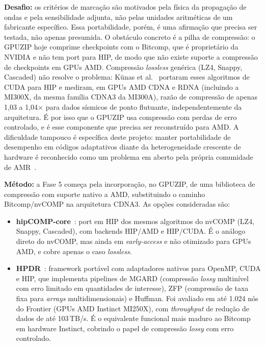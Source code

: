 \documentclass[12pt,a4paper]{article}
\begin{document}
\textbf{Desafio:} os critérios de marcação são motivados pela física da
propagação de ondas e pela sensibilidade adjunta, não pelas unidades
aritméticas de um fabricante específico. Essa portabilidade, porém, é uma
afirmação que precisa ser testada, não apenas presumida. O obstáculo
concreto é a pilha de compressão: o GPUZIP hoje comprime checkpoints com o
Bitcomp, que é proprietário da NVIDIA e não tem port para HIP, de modo que
não existe suporte a compressão de checkpoints em GPUs AMD. Compressão
\emph{lossless} genérica (LZ4, Snappy, Cascaded) não resolve o problema:
Künas et al.~\cite{kunas2026amdcompression} portaram esses algoritmos de
CUDA para HIP e mediram, em GPUs AMD CDNA e RDNA (incluindo a MI300X, da
mesma família CDNA3 da MI300A), razão de compressão de apenas 1,03 a
1,04$\times$ para dados sísmicos de ponto flutuante, independentemente da
arquitetura. É por isso que o GPUZIP usa compressão com perdas de erro
controlado, e é esse componente que precisa ser reconstruído para AMD. A
dificuldade tampouco é específica deste projeto: manter portabilidade de
desempenho em códigos adaptativos diante da heterogeneidade crescente de
hardware é reconhecido como um problema em aberto pela própria comunidade
de AMR~\cite{dubey2021portability}.

\textbf{Método:} a Fase 5 começa pela incorporação, no GPUZIP, de uma
biblioteca de compressão com suporte nativo a AMD, substituindo o caminho
Bitcomp/nvCOMP na arquitetura CDNA3. As opções consideradas são:

\begin{itemize}
  \item \textbf{hipCOMP-core}~\cite{hipcompcore}: port em HIP dos mesmos
        algoritmos do nvCOMP (LZ4, Snappy, Cascaded), com backends HIP/AMD
        e HIP/CUDA. É o análogo direto do nvCOMP, mas ainda em
        \emph{early-access} e não otimizado para GPUs AMD, e cobre apenas
        o caso \emph{lossless}.
  \item \textbf{HPDR}~\cite{chen2025hpdr}: framework portável com
        adaptadores nativos para OpenMP, CUDA e HIP, que implementa
        pipelines de MGARD (compressão \emph{lossy} multinível com erro
        limitado em quantidades de interesse), ZFP (compressão de taxa
        fixa para \emph{arrays} multidimensionais) e Huffman. Foi avaliado
        em até 1.024 nós do Frontier (GPUs AMD Instinct MI250X), com
        \emph{throughput} de redução de dados de até 103\,TB/s. É o
        equivalente funcional mais maduro ao Bitcomp em hardware Instinct,
        cobrindo o papel de compressão \emph{lossy} com erro controlado.
\end{itemize}
\end{document}
